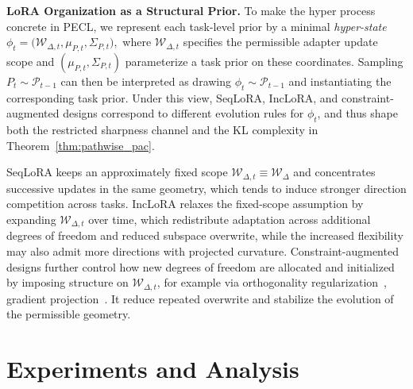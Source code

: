 \documentclass{article}
\theoremstyle{plain}
\theoremstyle{definition}
\theoremstyle{remark}
\begin{document}
\noindent\textbf{LoRA Organization as a Structural Prior.}\quad 
To make the hyper process concrete in PECL, we represent each task-level prior by a minimal \emph{hyper-state}
$
\phi_t = \bigl(\mathcal W_{\Delta,t},\mu_{P,t},\Sigma_{P,t}\bigr),
$
where $\mathcal W_{\Delta,t}$ specifies the permissible adapter update scope and $(\mu_{P,t},\Sigma_{P,t})$ parameterize a task prior on these coordinates.
Sampling $P_t\sim\mathcal P_{t-1}$ can then be interpreted as drawing $\phi_t\sim\mathcal P_{t-1}$ and instantiating the corresponding task prior. Under this view, SeqLoRA, IncLoRA, and constraint-augmented designs correspond to different evolution rules for $\phi_t$, and thus shape both the restricted sharpness channel and the KL complexity in Theorem~\ref{thm:pathwise_pac}.




SeqLoRA keeps an approximately fixed scope $\mathcal W_{\Delta,t}\equiv\mathcal W_\Delta$ and concentrates successive updates in the same geometry, which tends to induce stronger direction competition across tasks.
IncLoRA relaxes the fixed-scope assumption by expanding $\mathcal W_{\Delta,t}$ over time, which redistribute adaptation across additional degrees of freedom and reduced subspace overwrite, while the increased flexibility may also admit more directions with projected curvature.
Constraint-augmented designs further control how new degrees of freedom are allocated and initialized by imposing structure on $\mathcal W_{\Delta,t}$, for example via orthogonality regularization~\cite{wang2023orthogonal}, gradient projection~\citep{liangInfLoRAInterferenceFreeLowRank2024a,yang2024parametercollisionhinderingcontinual}.
It reduce repeated overwrite and stabilize the evolution of the permissible geometry.


\section{Experiments and Analysis}
\end{document}
